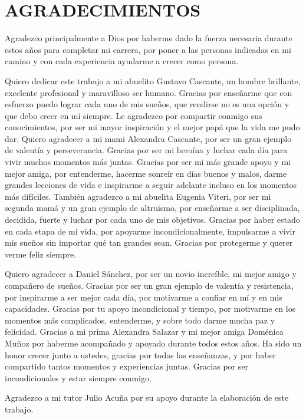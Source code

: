 \documentclass[../main.tex]{subfiles}
\begin{document}
\section*{AGRADECIMIENTOS}
\vspace{-0.5cm}
Agradezco principalmente a Dios por haberme dado la fuerza necesaria durante estos años para completar mi carrera, por poner a las personas indicadas en mi camino y con cada experiencia ayudarme a crecer como persona. 

Quiero dedicar este trabajo a mi abuelito Gustavo Cascante, un hombre brillante, excelente profesional y maravilloso ser humano. Gracias por enseñarme que con esfuerzo puedo lograr cada uno de mis sueños, que rendirse no es una opción y que debo creer en mí siempre. Le agradezco por compartir conmigo sus conocimientos, por ser mi mayor inspiración y el mejor papá que la vida me pudo dar. Quiero agradecer a mi mami Alexandra Cascante, por ser un gran ejemplo de valentía y perseverancia. Gracias por ser mi heroína y luchar cada día para vivir muchos momentos más juntas. Gracias por ser mi más grande apoyo y mi mejor amiga, por entenderme, hacerme sonreír en días buenos y malos, darme grandes lecciones de vida e inspirarme a seguir adelante incluso en los momentos más difíciles. También agradezco a mi abuelita Eugenia Viteri, por ser mi segunda mamá y un gran ejemplo de altruismo, por enseñarme a ser disciplinada, decidida, fuerte y luchar por cada uno de mis objetivos. Gracias por haber estado en cada etapa de mi vida, por apoyarme incondicionalmente, impulsarme a vivir mis sueños sin importar qué tan grandes sean. Gracias por protegerme y querer verme feliz siempre.

Quiero agradecer a Daniel Sánchez, por ser un novio increíble, mi mejor amigo y compañero de sueños. Gracias por ser un gran ejemplo de valentía y resistencia, por inspirarme a ser mejor cada día, por motivarme a confiar en mí y en mis capacidades. Gracias por tu apoyo incondicional y tiempo, por motivarme en los momentos más complicados, entenderme, y sobre todo darme mucha paz y felicidad. Gracias a mi prima Alexandra Salazar y mi mejor amiga Doménica Muñoz por haberme acompañado y apoyado durante todos estos años. Ha sido un honor crecer junto a ustedes, gracias por todas las enseñanzas, y por haber compartido tantos momentos y experiencias juntas. Gracias por ser incondicionales y estar siempre conmigo.

Agradezco a mi tutor Julio Acuña por su apoyo durante la elaboración de este trabajo.
\end{document}
